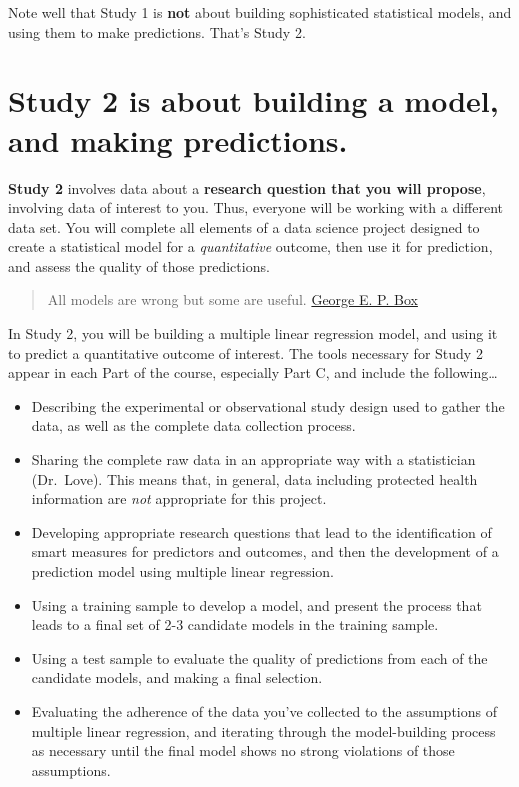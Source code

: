 \documentclass[]{book}
\providecommand{\tightlist}{%
  \setlength{\itemsep}{0pt}\setlength{\parskip}{0pt}}
\theoremstyle{definition}
\theoremstyle{definition}
\theoremstyle{definition}
\theoremstyle{remark}
\begin{document}
Note well that Study 1 is \textbf{not} about building sophisticated
statistical models, and using them to make predictions. That's Study 2.

\hypertarget{study-2-is-about-building-a-model-and-making-predictions.}{%
\section{Study 2 is about building a model, and making
predictions.}\label{study-2-is-about-building-a-model-and-making-predictions.}}

\textbf{Study 2} involves data about a \textbf{research question that
you will propose}, involving data of interest to you. Thus, everyone
will be working with a different data set. You will complete all
elements of a data science project designed to create a statistical
model for a \emph{quantitative} outcome, then use it for prediction, and
assess the quality of those predictions.

\begin{quote}
All models are wrong but some are useful.
\href{https://en.wikipedia.org/wiki/All_models_are_wrong}{George E. P.
Box}
\end{quote}

In Study 2, you will be building a multiple linear regression model, and
using it to predict a quantitative outcome of interest. The tools
necessary for Study 2 appear in each Part of the course, especially Part
C, and include the following\ldots{}

\begin{itemize}
\tightlist
\item
  Describing the experimental or observational study design used to
  gather the data, as well as the complete data collection process.
\item
  Sharing the complete raw data in an appropriate way with a
  statistician (Dr.~Love). This means that, in general, data including
  protected health information are \emph{not} appropriate for this
  project.
\item
  Developing appropriate research questions that lead to the
  identification of smart measures for predictors and outcomes, and then
  the development of a prediction model using multiple linear
  regression.
\item
  Using a training sample to develop a model, and present the process
  that leads to a final set of 2-3 candidate models in the training
  sample.
\item
  Using a test sample to evaluate the quality of predictions from each
  of the candidate models, and making a final selection.
\item
  Evaluating the adherence of the data you've collected to the
  assumptions of multiple linear regression, and iterating through the
  model-building process as necessary until the final model shows no
  strong violations of those assumptions.
\end{itemize}
\end{document}
